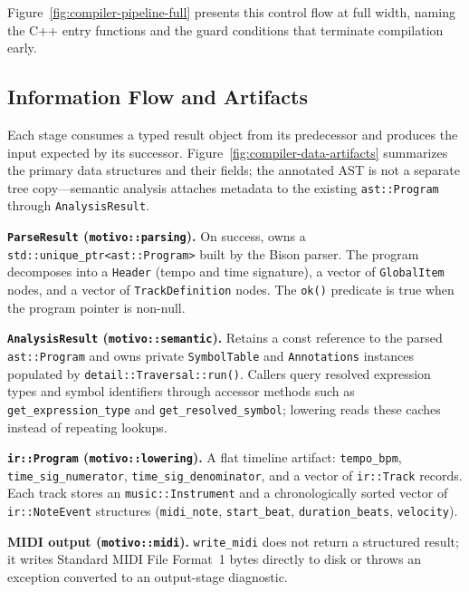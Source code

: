 Figure~\ref{fig:compiler-pipeline-full} presents this control flow at full width, naming the C++ entry functions and
the guard conditions that terminate compilation early.

\subsection{Information Flow and Artifacts}\label{detail-subsec:information-flow-and-artifacts}

Each stage consumes a typed result object from its predecessor and produces the input expected by its successor.
Figure~\ref{fig:compiler-data-artifacts} summarizes the primary data structures and their fields; the annotated AST is
not a separate tree copy---semantic analysis attaches metadata to the existing \texttt{ast::Program} through
\texttt{AnalysisResult}.

\noindent \textbf{\texttt{ParseResult} (\texttt{motivo::parsing}).}
On success, owns a \texttt{std::unique\_ptr\textless ast::Program\textgreater{}} built by the Bison parser.
The program decomposes into a \texttt{Header} (tempo and time signature), a vector of \texttt{GlobalItem} nodes, and a
vector of \texttt{TrackDefinition} nodes.
The \texttt{ok()} predicate is true when the program pointer is non-null.

\noindent \textbf{\texttt{AnalysisResult} (\texttt{motivo::semantic}).}
Retains a const reference to the parsed \texttt{ast::Program} and owns private \texttt{SymbolTable} and
\texttt{Annotations} instances populated by \texttt{detail::Traversal::run()}.
Callers query resolved expression types and symbol identifiers through accessor methods such as
\texttt{get\_expression\_type} and \texttt{get\_resolved\_symbol}; lowering reads these caches instead of repeating
lookups.

\noindent \textbf{\texttt{ir::Program} (\texttt{motivo::lowering}).}
A flat timeline artifact: \texttt{tempo\_bpm}, \texttt{time\_sig\_numerator}, \texttt{time\_sig\_denominator}, and a
vector of \texttt{ir::Track} records.
Each track stores an \texttt{music::Instrument} and a chronologically sorted vector of \texttt{ir::NoteEvent} structures
(\texttt{midi\_note}, \texttt{start\_beat}, \texttt{duration\_beats}, \texttt{velocity}).

\noindent \textbf{MIDI output (\texttt{motivo::midi}).}
\texttt{write\_midi} does not return a structured result; it writes Standard MIDI File Format~1 bytes directly to disk
or throws an exception converted to an output-stage diagnostic.

